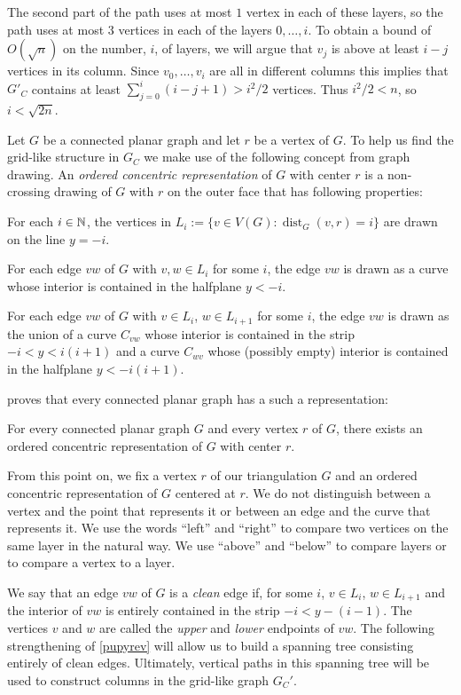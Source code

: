 \documentclass{patmorin}
\newcommand{\defin}[1]{\emph{\textcolor{brightmaroon}{#1}}}
\DeclareMathOperator{\dist}{dist}
\begin{document}
The second part of the path uses at most $1$ vertex in each of these layers, so the path uses at most $3$ vertices in each of the layers $0,\ldots,i$. To obtain a bound of $O(\sqrt{n})$ on the number, $i$, of layers, we will argue that $v_j$ is above at least $i-j$ vertices in its column.  Since $v_0,\ldots,v_i$ are all in different columns this implies that $G'_C$ contains at least $\sum_{j=0}^i(i-j+1)>i^2/2$ vertices.  Thus $i^2/2 < n$, so $i< \sqrt{2n}$.

Let $G$ be a connected planar graph and let $r$ be a vertex of $G$. To help us find the grid-like structure in $G_C$ we make use of the following concept from graph drawing. An \defin{ordered concentric representation} of $G$ with center $r$ is a non-crossing drawing of $G$ with $r$ on the outer face that has following properties:
\begin{compactenum}[(i)]
  \item For each $i\in\mathbb{N}$, the vertices in $L_i:=\{v\in V(G):\dist_G(v,r)=i\}$ are drawn on the line $y=-i$.
  \item For each edge $vw$ of $G$ with $v,w\in L_i$ for some $i$, the edge $vw$ is drawn as a curve whose interior is contained in the halfplane $y<-i$.
  \item For each edge $vw$ of $G$ with $v\in L_i$, $w\in L_{i+1}$ for some $i$, the edge $vw$ is drawn as the union of a curve $C_{vw}$ whose interior is contained in the strip $-i< y<i(i+1)$ and a curve $C_{wv}$ whose (possibly empty) interior is contained in the halfplane $y<-i(i+1)$.
\end{compactenum}

\citet{pupyrev:mixed} proves that every connected planar graph has a such a representation:

\begin{lem}\label{pupyrev}
  For every connected planar graph $G$ and every vertex $r$ of $G$, there exists an ordered concentric representation of $G$ with center $r$.
\end{lem}

From this point on, we fix a vertex $r$ of our triangulation $G$ and an ordered concentric representation of $G$ centered at $r$.  We do not distinguish between a vertex and the point that represents it or between an edge and the curve that represents it.  We use the words ``left'' and ``right'' to compare two vertices on the same layer in the natural way.  We use ``above'' and ``below'' to compare layers or to compare a vertex to a layer.

We say that an edge $vw$ of $G$ is a \defin{clean} edge if, for some $i$, $v\in L_i$, $w\in L_{i+1}$ and the interior of $vw$ is entirely contained in the strip $-i < y -(i-1)$.  The vertices $v$ and $w$ are called the \defin{upper} and \defin{lower} endpoints of $vw$.  The following strengthening of \cref{pupyrev} will allow us to build a spanning tree consisting entirely of clean edges.  Ultimately, vertical paths in this spanning tree will be used to construct columns in the grid-like graph $G_C'$.
\end{document}
